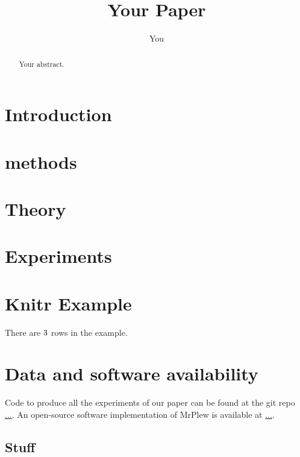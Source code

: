 \documentclass{article}
\title{Your Paper}
\author{You}
\begin{document}
\maketitle

\begin{abstract}
Your abstract.
\end{abstract}


\section{Introduction}


\section{methods}



\section{Theory}



\section{Experiments}



\section{Knitr Example}

There are $3$ rows in the example.

\ExamplePlot{}

\ExampleTable{}








\section{Data and software availability}

Code to produce all the experiments of our paper
can be found at the git repo\\
\url{...}.  An
open-source software implementation of MrPlew is available
at \url{...}.

\newpage
\printbibliography


\newpage
\begin{appendices}

\section{Stuff}\label{app:stuff}
\end{appendices}
\end{document}
